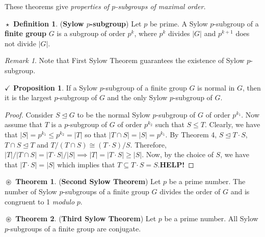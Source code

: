 \documentclass{article}
\theoremstyle{definition}
\newtheorem{definition}{$\boxed{\star}$ Definition}
\newtheorem{theorem}{$\boxed{\boxed{\circledast}}$ Theorem}
\theoremstyle{remark}
\newtheorem*{remark}{Remark}
\theoremstyle{definition}
\theoremstyle{definition}
\newtheorem{proposition}{$\checkmark$ Proposition}
\theoremstyle{definition}
\theoremstyle{proof}
\newcommand{\order}[1]{\left\vert #1 \right\vert}
\newcommand{\nsg}[0]{\trianglelefteq}
\newcommand{\isomorph}{\cong}
\begin{document}
These theorems give \emph{properties of $ p $-subgroups of maximal order.}
\begin{definition}
	(\textbf{Sylow $ p $-subgroup}) Let $ p $ be prime. A Sylow $ p $-subgroup of a \textbf{finite group} $ G $ is a subgroup of order $ p^k $, where $ p^k $ divides $ \order{G} $ and $ p^{k+1} $ does not divide $ \order{G} $.
\end{definition}
\begin{remark}
	Note that First Sylow Theorem guarantees the existence of Sylow $ p $-subgroup.
\end{remark}
\hrulefill
\begin{proposition}
	If a Sylow $ p $-subgroup of a finite group $ G $ is normal in $ G $, then it is the largest $ p $-subgroup of $ G $ and the only Sylow $ p $-subgroup of $ G $.
\end{proposition}
\begin{proof}
	Consider $ S\nsg G $ to be the normal Sylow $ p $-subgroup of $ G $ of order $ p^{k_1} $. Now assume that $ T $ is a $ p $-subgroup of $ G $ of order $ p^{k_2} $ such that $ S\le T $. Clearly, we have that $ \order{S} = p^{k_1} \le p^{k_2} = \order{T} $ so that $ \order{T\cap S} = \order{S} = p^{k_1} $. By Theorem 4, $ S\nsg T\cdot S $, $ T\cap S \nsg T $ and $ T/(T\cap S) \isomorph (T\cdot S)/S $. Therefore, $ \order{T}/\order{T\cap S} = \order{T\cdot S}/\order{S} \implies \order{T} = \order{T\cdot S}\ge \order{S}$. Now, by the choice of $ S $, we have that $ \order{T\cdot S} = \order{S} $ which implies that $ T\subseteq T\cdot S = S $.\textbf{HELP!}
\end{proof}
\hrulefill
\begin{theorem}
	(\textbf{Second Sylow Theorem}) Let $ p $ be a prime number. The number of Sylow $ p $-subgroups of a finite group $ G $ divides the order of $ G $ and is congruent to 1 \textit{modulo} $ p $.
\end{theorem}
\begin{theorem}
	(\textbf{Third Sylow Theorem}) Let $ p $ be a prime number. All Sylow $ p $-subgroups of a finite group are conjugate.
\end{theorem}
\end{document}
